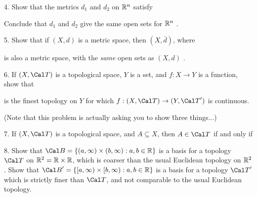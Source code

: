 \ssk

\item{4.} Show that the metrics $d_1$ and $d_2$ on ${\Bbb R}^n$ satisfy

\ssk


\ssk

\item{} Conclude that $d_1$ and $d_2$ give the same open sets for ${\Bbb R}^n$ .

\ssk


\item{5.} Show that if $(X,d)$ is a metric space, then $(X,\bar{d})$, where

\ssk


\ssk

\item{} is also a metric space, with the {\it same} open sets as $(X,d)$ .

\ssk

\item{6.} If $(X,{\Cal T})$ is a topological space, $Y$ is a set, and $f:X\rightarrow Y$ is a function, show that


\ssk


\ssk

is the finest topology on $Y$ for which $f:(X,{\Cal T})\rightarrow (Y,{\Cal T}^\prime)$ is continuous.

\ssk

(Note that this problem is actually asking you to show \u{three} things...)

\ssk

\item{7.} If $(X,{\Cal T})$ is a topological space, and $A\subseteq X$,  then $A\in {\Cal T}$ if and only if

\ssk


\ssk

\item{8.} Show that ${\Cal B} = \{(a,\infty)\times(b,\infty) : a,b\in{\Bbb R}\}$ is a basis for a topology ${\Cal T}$
on ${\Bbb R}^2={\Bbb R}\times {\Bbb R}$, which is coarser than the usual Euclidean topology on ${\Bbb R}^2$.
Show that ${\Cal B}^\prime = \{[a,\infty)\times[b,\infty) : a,b\in{\Bbb R}\}$ is a basis for a topology ${\Cal T}^\prime$ which is 
strictly finer than ${\Cal T}$, and not comparable to the usual Euclidean topology.

